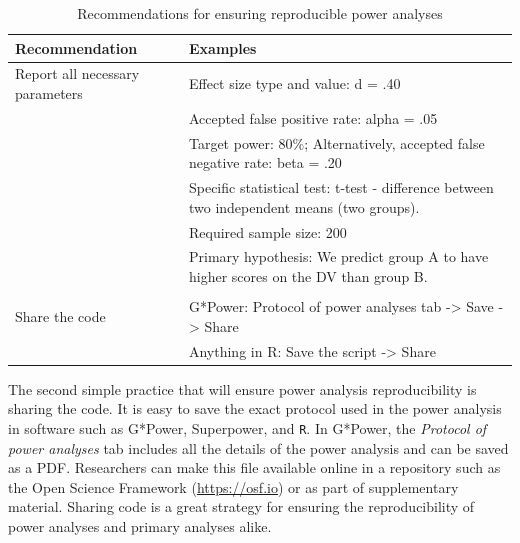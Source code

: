 \documentclass[
  man, donotrepeattitle,mask,floatsintext]{apa7}
\begin{document}
\begin{landscape}
\begin{longtable}[l]{ll}
\caption{\label{tab:table1}Recommendations for ensuring reproducible power analyses}\\
\toprule
Recommendation & Examples\\
\midrule
Report all necessary parameters & Effect size type and value: d = .40\\
\addlinespace
 & Accepted false positive rate: alpha = .05\\
\addlinespace
 & Target power: 80\%; Alternatively, accepted false negative rate: beta = .20\\
\addlinespace
 & Specific statistical test: t-test - difference between two independent means (two groups).\\
\addlinespace
 & Required sample size: 200\\
\addlinespace
 & Primary hypothesis: We predict group A to have higher scores on the DV than group B.\\
\addlinespace
 & \\
\addlinespace
Share the code & G*Power: Protocol of power analyses tab -> Save -> Share\\
\addlinespace
 & Anything in R: Save the script -> Share\\
\bottomrule
\end{longtable}
\end{landscape}
\endgroup{}

The second simple practice that will ensure power analysis reproducibility is sharing the code. It is easy to save the exact protocol used in the power analysis in software such as G*Power, Superpower, and \texttt{R}. In G*Power, the \emph{Protocol of power analyses} tab includes all the details of the power analysis and can be saved as a PDF. Researchers can make this file available online in a repository such as the Open Science Framework (\url{https://osf.io}) or as part of supplementary material. Sharing code is a great strategy for ensuring the reproducibility of power analyses and primary analyses alike.
\end{document}
